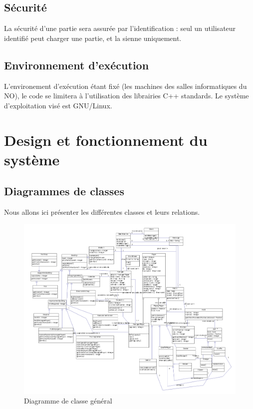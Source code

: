 \documentclass[a4paper,titlepage]{scrreprt}
\begin{document}
  \subsection{Sécurité}
  La sécurité d'une partie sera assurée par l'identification : 
  seul un utilisateur identifié peut charger une partie, et la sienne uniquement.
  \subsection{Environnement d'exécution}
  L'environement d'exécution étant fixé (les machines des salles informatiques du NO), 
  le code se limitera à l'utilisation des librairies C++ standards. 
  Le système d'exploitation visé est GNU/Linux.
\section{Design et fonctionnement du système}
  \subsection{Diagrammes de classes}
  Nous allons ici présenter les différentes classes et leurs relations.
    \begin{figure}[H]
    \center
    \includegraphics[scale=0.3]{uml/class/ClassDiagram.png}
    \caption{Diagramme de classe général}
  \end{figure}	
\end{document}
